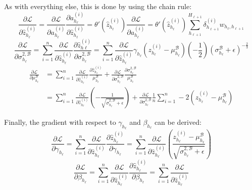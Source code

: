 As with everything else, this is done by using the chain rule:
\begin{equation}
\frac{\partial \mathcal{L}}{\partial \hat{z}_{h_\ell}^{(i)}} = \frac{\partial \mathcal{L}}{\partial a_{h_\ell}^{(i)}} \frac{\partial a_{h_\ell}^{(i)}}{\partial \hat{z}_{h_\ell}^{(i)}} = \theta'(\hat{z}_{h_\ell}^{(i)}) \frac{\partial\mathcal{L}}{\partial a_{h_\ell}^{(i)}} = \theta'(\hat{z}_{h_\ell}^{(i)}) \sum_{h_{\ell+1}}^{H_{\ell+1}} \delta_{h_{\ell+1}}^{(i)} w_{h_\ell, h_{\ell+1}}
\end{equation}
\begin{equation}
\frac{\partial \mathcal{L}}{\partial \sigma_{h_\ell}^{2,\mathcal{B}}} = \sum_{i=1}^n \frac{\partial \mathcal{L}}{\partial \hat{z}_{h_\ell}^{(i)}} \frac{\partial \hat{z}_{h\ell}^{(i)}}{\partial \sigma_{h_\ell}^{2, \mathcal{B}}} = \sum_{i=1}^n \frac{\partial \mathcal{L}}{\partial \hat{z}_{h_\ell}^{(i)}} \gamma_{h_\ell} \left(z_{h_\ell}^{(i)} - \mu_{h_\ell}^{\mathcal{B}}\right) \left(-\frac{1}{2}\right) \left(\sigma_{h_\ell}^{\mathcal{B}} + \epsilon\right)^{-\frac{2}{3}}
\end{equation}
\begin{equation}
\begin{aligned}
\frac{\partial \mathcal{L}}{\partial \mu_{h_\ell}^{\mathcal{B}}} &= \sum_{i=1}^n \frac{\partial \mathcal{L}}{\partial \hat{z}_{h_\ell}^{(i)}} \frac{\partial \hat{z}_{h_\ell}^{(i)}}{\mu_{h_\ell}^{\mathcal{B}}} + \frac{\partial \mathcal{L}}{\partial \sigma_{h_\ell}^{2, \mathcal{B}}} \frac{\partial \sigma_{h_\ell}^{2, \mathcal{B}}}{\mu_{h_\ell}^{\mathcal{B}}} \\
&= \sum_{i=1}^n \frac{\partial \mathcal{L}}{\partial \hat{z}_{h_\ell}^{(i)}} \left(- \frac{1}{\sqrt{\sigma_{h_\ell}^{2, \mathcal{B}} + \epsilon}}\right) + \frac{\partial \mathcal{L}}{\partial \sigma_{h_\ell}^{2, \mathcal{B}}} \frac{1}{n} \sum_{i=1}^n -2 \left(z_{h_\ell}^{(i)} - \mu_{h_\ell}^{\mathcal{B}}\right)
\end{aligned}
\end{equation}

Finally, the gradient with respect to $\gamma_{h_\ell}$ and $\beta_{h_\ell}$ can be derived:
\begin{equation}
\frac{\partial \mathcal{L}}{\partial \gamma_{h_\ell}} = \sum_{i=1}^n \frac{\partial \mathcal{L}}{\partial \hat{z}_{h_\ell}^{(i)}} \frac{\partial \hat{z}_{h_\ell}^{(i)}}{\partial \gamma_{h_\ell}} = \sum_{i=1}^n \frac{\partial \mathcal{L}}{\partial \hat{z}_{h_\ell}^{(i)}} \left(\frac{z_{h_\ell}^{(i)} - \mu_{h_\ell}^{\mathcal{B}}}{\sqrt{\sigma_{h_\ell}^{2, \mathcal{B}} + \epsilon}} \right)
\end{equation}
\begin{equation}
\frac{\partial \mathcal{L}}{\partial \beta_{h_\ell}} = \sum_{i=1}^n \frac{\partial \mathcal{L}}{\partial \hat{z}_{h_\ell}^{(i)}} \frac{\partial \hat{z}_{h_\ell}^{(i)}}{\partial \beta_{h_\ell}} = \sum_{i=1}^n \frac{\partial \mathcal{L}}{\partial \hat{z}_{h_\ell}^{(i)}}
\end{equation}


